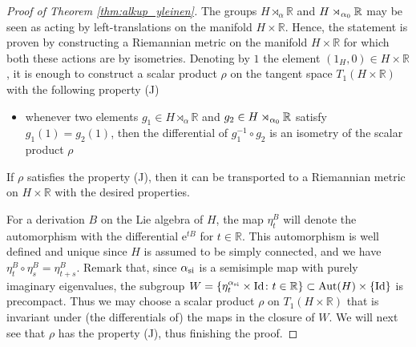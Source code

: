 \documentclass[a4paper,12pt]{amsart}
\newcommand{\pp}{\mathrm}
\newcommand{\e}{\mathrm{e}}
\newcommand{\Id}{\mathrm{Id}}
\theoremstyle{plain}
\theoremstyle{definition}
\theoremstyle{plain}
\theoremstyle{remark}
\begin{document}
\begin{proof}[Proof of Theorem \ref{thm:alkup_yleinen}]
	The groups \( H \rtimes_\alpha \mathbb{R} \) and \( H \rtimes_{{\alpha_0}} \mathbb{R} \) may be seen as acting by left-translations on the manifold \( H \times \mathbb{R} \).
	Hence, the statement is proven by constructing a Riemannian metric on the manifold \( H \times \mathbb{R} \) for which both these actions are by isometries. 
	Denoting by \( 1\) the element \( (1_H,0) \in H \times \mathbb{R}  \),
	it is enough to construct a scalar product \( \rho \) on the tangent space \( T_{1} (H \times \mathbb{R}) \) with the following property%
	\newcommand{\propJ}{(J)}
	\propJ
	\begin{itemize}
		\item[\propJ] whenever two elements \( g_1 \in H \rtimes_\alpha \mathbb{R} \) and \( g_2 \in H \rtimes_{{\alpha_0}} \mathbb{R} \) satisfy 
		\( g_1(1) = g_2(1) \),
		then the differential of \( g_1^{-1} \circ g_2 \) is an isometry of the scalar product \( \rho \)
	\end{itemize}
	If \( \rho \) satisfies the property \propJ, then it can be transported to a Riemannian metric on \(  H \times \mathbb{R}  \) with the desired properties.
	
	For a derivation \( B \) on the Lie algebra of \( H \), the map \( \eta_t^B \) will denote the automorphism with the differential \( \e^{t B} \) for \( t \in \mathbb{R} \). This automorphism is well defined and unique since \( H \) is assumed to be simply connected, and we have \( \eta_t^B \circ \eta_s^B = \eta_{t+s}^B \). 
	Remark that, since \( \AIm \) is a semisimple map with purely imaginary eigenvalues, the subgroup \( W = \{ \eta^{\AIm}_t \times \Id \colon t \in \mathbb{R} \} \subset \pp{Aut}(H) \times \{\Id\} \) is precompact. Thus we may choose a scalar product \( \rho \) on \( T_{1} (H \times \mathbb{R}) \) that is invariant under (the differentials of) the maps in the closure of \( W \). We will next see that \( \rho \) has the property \propJ, thus finishing the proof.
	

\end{proof}
\end{document}
